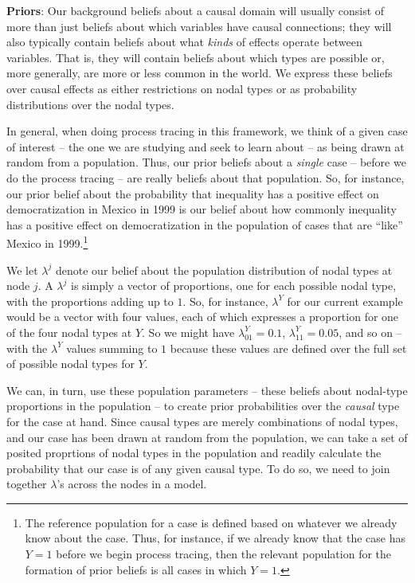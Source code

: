 \documentclass[
  12pt,
]{book}
\begin{document}
\textbf{Priors}: Our background beliefs about a causal domain will usually consist of more than just beliefs about which variables have causal connections; they will also typically contain beliefs about what \emph{kinds} of effects operate between variables. That is, they will contain beliefs about which types are possible or, more generally, are more or less common in the world. We express these beliefs over causal effects as either restrictions on nodal types or as probability distributions over the nodal types.

In general, when doing process tracing in this framework, we think of a given case of interest -- the one we are studying and seek to learn about -- as being drawn at random from a population. Thus, our prior beliefs about a \emph{single} case -- before we do the process tracing -- are really beliefs about that population. So, for instance, our prior belief about the probability that inequality has a positive effect on democratization in Mexico in 1999 is our belief about how commonly inequality has a positive effect on democratization in the population of cases that are ``like'' Mexico in 1999.\footnote{The reference population for a case is defined based on whatever we already know about the case. Thus, for instance, if we already know that the case has \(Y=1\) before we begin process tracing, then the relevant population for the formation of prior beliefs is all cases in which \(Y=1\).}

We let \(\lambda^j\) denote our belief about the population distribution of nodal types at node \(j\). A \(\lambda^j\) is simply a vector of proportions, one for each possible nodal type, with the proportions adding up to \(1\). So, for instance, \(\lambda^Y\) for our current example would be a vector with four values, each of which expresses a proportion for one of the four nodal types at \(Y\). So we might have \(\lambda^Y_{01}=0.1\), \(\lambda^Y_{11}=0.05\), and so on -- with the \(\lambda^Y\) values summing to \(1\) because these values are defined over the full set of possible nodal types for \(Y\).

We can, in turn, use these population parameters -- these beliefs about nodal-type proportions in the population -- to create prior probabilities over the \emph{causal} type for the case at hand. Since causal types are merely combinations of nodal types, and our case has been drawn at random from the population, we can take a set of posited proprtions of nodal types in the population and readily calculate the probability that our case is of any given causal type. To do so, we need to join together \(\lambda\)'s across the nodes in a model.
\end{document}
